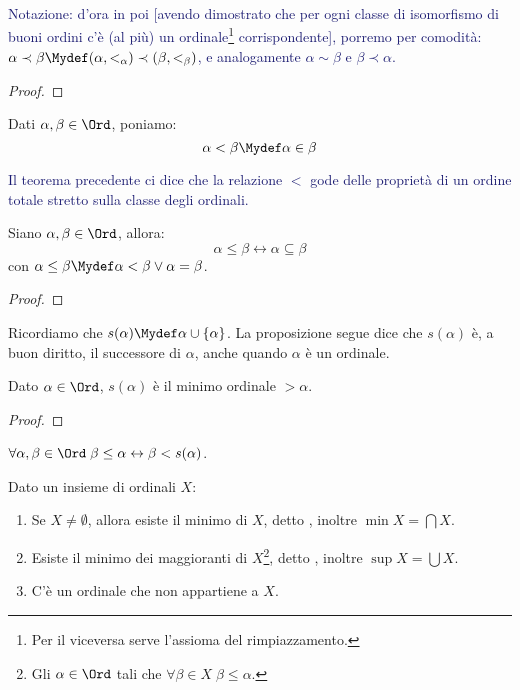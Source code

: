 \documentclass[11pt]{scrartcl}
\begin{document}
\textcolor{MidnightBlue}{Notazione: d'ora in poi [avendo dimostrato che per ogni classe di isomorfismo di buoni ordini c'è (al più) un ordinale\footnote{Per il
viceversa serve l'assioma del rimpiazzamento.} corrispondente], porremo per comodità: $\alpha \prec \beta \Mydef (\alpha,<_\alpha) \prec (\beta,<_\beta)$, e analogamente $\alpha \sim \beta$ e $\beta \prec \alpha$.}

\begin{proof}
	
\end{proof}

\begin{notation}
	Dati $\alpha,\beta \in \Ord$, poniamo:
	\[ \alpha < \beta \Mydef \alpha \in \beta
		\]
\end{notation}

\textcolor{MidnightBlue}{Il teorema precedente ci dice che la relazione $<$ gode delle proprietà di un ordine totale stretto sulla classe degli ordinali.}

\begin{proposition}
	Siano $\alpha,\beta \in \Ord$, allora:
	\[ \alpha \leq \beta \leftrightarrow \alpha \subseteq \beta
		\]
	con $\alpha \leq \beta \Mydef \alpha < \beta \lor \alpha = \beta$.
\end{proposition}

\begin{proof}
	
\end{proof}

Ricordiamo che $s(\alpha) \Mydef \alpha \cup \{\alpha\}$. La proposizione segue dice che $s(\alpha)$ è, a buon diritto, il successore di $\alpha$, anche quando $\alpha$
è un ordinale.

\begin{proposition}
	Dato $\alpha \in \Ord$, $s(\alpha)$ è il minimo ordinale $> \alpha$.
\end{proposition}

\begin{proof}
	
\end{proof}

\begin{corollary}
	$\forall \alpha,\beta \in\Ord \; \beta \leq \alpha \leftrightarrow \beta < s(\alpha)$.
\end{corollary}

\begin{proposition}
	Dato un insieme di ordinali $X$:
	\begin{enumerate}[1.]
		\item Se $X \ne \emptyset$, allora esiste il minimo di $X$, detto , inoltre $\min X = \bigcap X$.
		\item Esiste il minimo dei maggioranti di $X$\footnote{Gli $\alpha \in \Ord$ tali che $\forall \beta \in X \; \beta \leq \alpha$.}, detto , inoltre $\sup X = \bigcup X$.
		\item C'è un ordinale che non appartiene a $X$.
	\end{enumerate}
\end{proposition}
\end{document}
